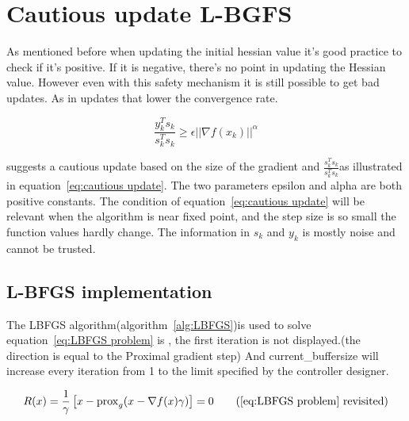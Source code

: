 	\section{Cautious update L-BGFS}
	As mentioned before when updating the initial hessian value it's good practice to check if it's positive. If it is negative, there's no point in updating the Hessian value. However even with this safety mechanism it is still possible to get bad updates. As in updates that lower the convergence rate.
	
	\begin{equation}
		\frac{y_k^Ts_k}{s_k^Ts_k} \ge \epsilon ||\nabla f(x_k)||^\alpha
		\label{eq:cautious update}
	\end{equation}
	
	\cite{Dong-HuiLi1999} suggests a cautious update based on the size of the gradient and $\frac{s_k^Ts_k}{s_k^Ts_k}$as illustrated in equation~\ref{eq:cautious update}. The two parameters epsilon and alpha are both positive constants. The condition of equation~\ref{eq:cautious update} will be relevant when the algorithm is near fixed point, and the step size is so small the function values hardly change. The information in $s_k$ and $y_k$ is mostly noise and cannot be trusted.
	
	\subsection{L-BFGS implementation}
		The LBFGS algorithm(algorithm~\ref{alg:LBFGS})is used to solve equation~\ref{eq:LBFGS problem} is , the first iteration is not displayed.(the direction is equal to the Proximal gradient step) And current\_buffersize will increase every iteration from 1 to the limit specified by the controller designer.
		
		\begin{equation}
			R(x) = \frac{1}{\gamma}\left[ x - \prox_g( x - \nabla f(x)\gamma) \right] = 0
			\tag{\ref{eq:LBFGS problem} revisited}
		\end{equation}
		
